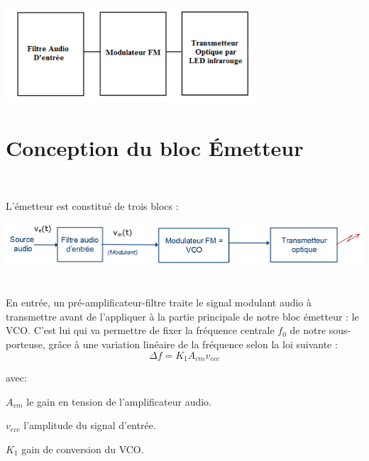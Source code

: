 \documentclass[a4paper]{report}
\begin{document}
\begin{center}
\includegraphics[width=0.7\textwidth]{bloc_emet3.PNG}
\end{center}

\part{Conception du bloc Émetteur}

$ $ 
\vspace{6cm}

L'émetteur est constitué de trois blocs : \\

\begin{center}
\includegraphics[width=1\textwidth]{bloc_emet.PNG}
\end{center}

\paragraph*{}

En entrée, un pré-amplificateur-filtre traite le signal modulant audio à transmettre avant de l'appliquer à la partie principale de notre bloc émetteur : le VCO. C'est lui qui va permettre de fixer la fréquence centrale $f_0$ de notre sous-porteuse, grâce à une variation linéaire de la fréquence selon la loi suivante :\\ 

$$\Delta f = K_1A_{vm}v_{ecc}$$

avec:
\begin{description}
\item	$A_{vm}$ le gain en tension de l'amplificateur audio.
\item $v_{ecc}$ l'amplitude du signal d'entrée.
\item $K_1$ gain de conversion du VCO.
\end{description}
\end{document}
